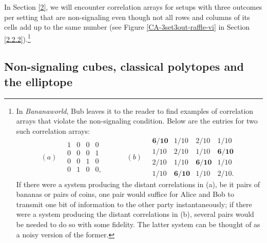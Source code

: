 In Section \ref{2}, we will encounter correlation arrays for setups with three outcomes per setting that are non-signaling even though not all rows and columns of its cells add up to the same number (see Figure \ref{CA-3set3out-raffle-vi} in Section \ref{2.2.2}).\footnote{In \emph{Bananaworld}, Bub leaves it to the reader to find examples of correlation arrays that violate the non-signaling condition. Below are the entries for two such correlation arrays:
$$
(a) \quad \begin{array}{cccc}
1  & 0  & 0 & 0 \; \\
 0 & 0  & 0 & 1 \; \\
 0 & 0  & 1 & 0 \; \\
 0 & 1 & 0 & 0,
\end{array}
\quad \quad \quad
(b) \quad \begin{array}{cccc}
\boldsymbol{6/10}  & 1/10  & 2/10 & 1/10 \; \\
1/10  & 2/10  & 1/10 & \boldsymbol{6/10} \; \\
2/10  & 1/10  & \boldsymbol{6/10} & 1/10 \; \\
1/10  & \boldsymbol{6/10}  & 1/10 & 2/10.
\end{array}
$$
If there were a system producing the distant correlations in (a), be it pairs of bananas or pairs of coins, one pair would suffice for Alice and Bob to transmit one bit of information to the other party instantaneously; if there were a system producing the distant correlations in (b), several pairs would be needed to do so with some fidelity. The latter system can be thought of as a noisy version of the former.}

\subsection{Non-signaling cubes, classical polytopes and the elliptope} \label{1.3}

